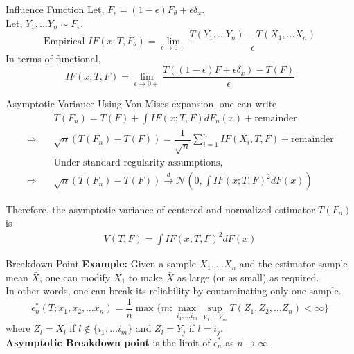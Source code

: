 \documentclass[10pt,xcolor=svgnames]{beamer} %
\begin{document}
\begin{frame}{Influence Function}
    Let, $F_{\epsilon} = (1-\epsilon)F_{\theta} + \epsilon \delta_x$.\\
    Let, $Y_1, \dots Y_n \sim F_{\epsilon}$.\\
    \begin{equation*}
        \text{Empirical } IF(x; T, F_{\theta}) = \lim_{\epsilon \rightarrow 0+}\dfrac{T(Y_1, \dots Y_n) - T(X_1, \dots X_n)}{\epsilon}
    \end{equation*}
    In terms of functional,
    \begin{equation*}
        IF(x; T, F) = \lim_{\epsilon \rightarrow 0+} \dfrac{T((1-\epsilon)F + \epsilon \delta_x ) - T(F)}{\epsilon}
    \end{equation*}
\end{frame}

\begin{frame}{Asymptotic Variance}
    Using Von Mises expansion, one can write
    \begin{align*}
        & T(F_n) = T(F) + \int IF(x; T, F) dF_n(x) + \text{remainder}\\
        \Rightarrow \quad & \sqrt{n}(T(F_n) - T(F)) = \dfrac{1}{\sqrt{n}} \sum_{i=1}^n IF(X_i, T, F) + \text{remainder}\\
        & \text{Under standard regularity assumptions,}\\
        \Rightarrow \quad & \sqrt{n}(T(F_n) - T(F)) \xrightarrow{d} \mathcal{N}\left( 0, \int IF(x; T, F)^2 dF(x) \right)
    \end{align*}
    \pause
    
    \noindent Therefore, the asymptotic variance of centered and normalized estimator $T(F_n)$ is 
    \begin{align*}
        V(T, F) = \int IF(x; T, F)^2 dF(x)
    \end{align*}
\end{frame}

\begin{frame}{Breakdown Point}
    \textbf{Example:} Given a sample $X_1, \dots X_n$ and the estimator sample mean $\bar{X}$, one can modify $X_1$ to make $\bar{X}$ as large (or as small) as required.\\
    In other words, one can break its reliability by contaminating only one sample.\\
    \pause 
    \begin{equation*}
        \epsilon_n^\ast(T; x_1, x_2, \dots x_n) 
        = \dfrac{1}{n} \max\{ m : \max_{i_1, \dots i_m} \sup_{Y_{1}, \dots Y_{m}} T(Z_1, Z_2, \dots Z_n) < \infty \}
    \end{equation*}
    \noindent where $Z_l = X_l$ if $l \notin \{ i_1, \dots i_m \}$ and $Z_l = Y_j$ if $l = i_j$.\\

    \pause
    \noindent \textbf{Asymptotic Breakdown point} is the limit of $\epsilon_n^\ast$ as $n \rightarrow \infty$.
\end{frame} 
\end{document}
